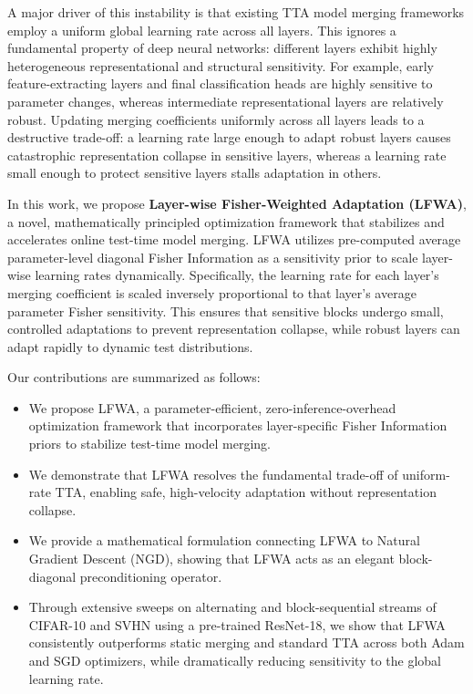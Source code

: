 \documentclass{article}
\theoremstyle{plain}
\theoremstyle{definition}
\theoremstyle{remark}
\begin{document}
A major driver of this instability is that existing TTA model merging frameworks employ a uniform global learning rate across all layers. This ignores a fundamental property of deep neural networks: different layers exhibit highly heterogeneous representational and structural sensitivity. For example, early feature-extracting layers and final classification heads are highly sensitive to parameter changes, whereas intermediate representational layers are relatively robust. Updating merging coefficients uniformly across all layers leads to a destructive trade-off: a learning rate large enough to adapt robust layers causes catastrophic representation collapse in sensitive layers, whereas a learning rate small enough to protect sensitive layers stalls adaptation in others.

In this work, we propose \textbf{Layer-wise Fisher-Weighted Adaptation (LFWA)}, a novel, mathematically principled optimization framework that stabilizes and accelerates online test-time model merging. LFWA utilizes pre-computed average parameter-level diagonal Fisher Information as a sensitivity prior to scale layer-wise learning rates dynamically. Specifically, the learning rate for each layer's merging coefficient is scaled inversely proportional to that layer's average parameter Fisher sensitivity. This ensures that sensitive blocks undergo small, controlled adaptations to prevent representation collapse, while robust layers can adapt rapidly to dynamic test distributions.

Our contributions are summarized as follows:
\begin{itemize}\setlength{\itemsep}{1pt}\setlength{\parskip}{0pt}\setlength{\parsep}{0pt}
    \item We propose LFWA, a parameter-efficient, zero-inference-overhead optimization framework that incorporates layer-specific Fisher Information priors to stabilize test-time model merging.
    \item We demonstrate that LFWA resolves the fundamental trade-off of uniform-rate TTA, enabling safe, high-velocity adaptation without representation collapse.
    \item We provide a mathematical formulation connecting LFWA to Natural Gradient Descent (NGD), showing that LFWA acts as an elegant block-diagonal preconditioning operator.
    \item Through extensive sweeps on alternating and block-sequential streams of CIFAR-10 and SVHN using a pre-trained ResNet-18, we show that LFWA consistently outperforms static merging and standard TTA across both Adam and SGD optimizers, while dramatically reducing sensitivity to the global learning rate.
\end{itemize}
\end{document}
